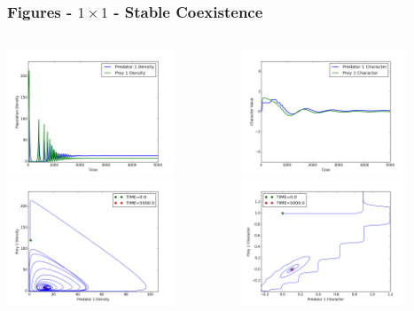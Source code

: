 \documentclass[10pt]{beamer}
\begin{document}
\begin{frame}
	\frametitle{Figures - $1\times1$ - Stable Coexistence}
	\begin{columns}[t]
		\begin{column}{.5\textwidth}
			\centering
			\includegraphics[width=5cm,height=3.75cm]{figures/1x1/variable_growth/stable_coexistence/densities.png}\\
			\includegraphics[width=5cm,height=3.75cm]{figures/1x1/variable_growth/stable_coexistence/density_phase_plane.png}
		\end{column}
		\begin{column}{.5\textwidth}
			\centering
			\includegraphics[width=5cm,height=3.75cm]{figures/1x1/variable_growth/stable_coexistence/traits.png}\\
			\includegraphics[width=5cm,height=3.75cm]{figures/1x1/variable_growth/stable_coexistence/trait_phase_plane.png}
		\end{column}
	\end{columns}
\end{frame}
\end{document}

